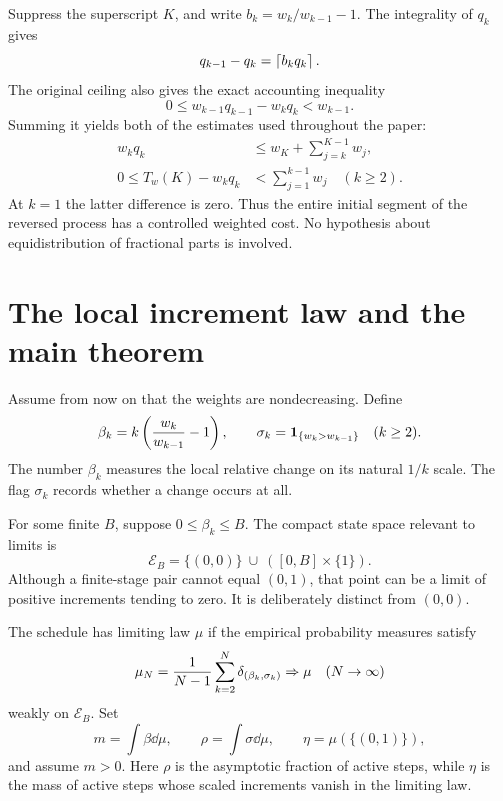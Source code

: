 Suppress the superscript $K$, and write $b_k=w_k/w_{k-1}-1$. The
integrality of $q_k$ gives
\begin{equation}\label{rex:sch:eq:integer-increment}
 q_{k-1}-q_k=\left\lceil b_kq_k\right\rceil.
\end{equation}
The original ceiling also gives the exact accounting inequality
\begin{equation}\label{rex:sch:eq:accounting}
 0\leq w_{k-1}q_{k-1}-w_kq_k<w_{k-1}.
\end{equation}
Summing it yields both of the estimates used throughout the paper:
\begin{align}
 w_kq_k&\leq w_K+\sum_{j=k}^{K-1}w_j,
 \label{rex:sch:eq:global-accounting}\\
 0\leq T_w(K)-w_kq_k&<\sum_{j=1}^{k-1}w_j\quad(k\geq2).
 \label{rex:sch:eq:tail-accounting}
\end{align}
At $k=1$ the latter difference is zero. Thus the entire initial segment
of the reversed process has a controlled weighted cost. No hypothesis
about equidistribution of fractional parts is involved.

\section{The local increment law and the main theorem}
\label{rex:sch:sec:main}

Assume from now on that the weights are nondecreasing. Define
\begin{equation}\label{rex:sch:eq:environment}
 \beta_k=k\left(\frac{w_k}{w_{k-1}}-1\right),\qquad
 \sigma_k=\mathbf 1_{\{w_k>w_{k-1}\}}\quad(k\geq2).
\end{equation}
The number $\beta_k$ measures the local relative change on its natural
$1/k$ scale. The flag $\sigma_k$ records whether a change occurs at all.

For some finite $B$, suppose $0\leq\beta_k\leq B$. The compact state
space relevant to limits is
\begin{equation}\label{rex:sch:eq:state-space}
 \mathcal E_B=\{(0,0)\}\ \cup\ ([0,B]\times\{1\}).
\end{equation}
Although a finite-stage pair cannot equal $(0,1)$, that point can be a
limit of positive increments tending to zero. It is deliberately
distinct from $(0,0)$.

\begin{definition}\label{rex:sch:def:law}
The schedule has limiting law $\mu$ if the empirical probability
measures satisfy
\begin{equation}\label{rex:sch:eq:empirical}
 \mu_N=\frac{1}{N-1}\sum_{k=2}^{N}\delta_{(\beta_k,\sigma_k)}
 \mathrel{\Rightarrow}\mu
 \quad(N\to\infty)
\end{equation}
weakly on $\mathcal E_B$. Set
\begin{equation}\label{rex:sch:eq:m-rho-eta}
 m=\int\beta\dd\mu,\qquad
 \rho=\int\sigma\dd\mu,\qquad
 \eta=\mu(\{(0,1)\}),
\end{equation}
and assume $m>0$. Here $\rho$ is the asymptotic fraction of active
steps, while $\eta$ is the mass of active steps whose scaled increments
vanish in the limiting law.
\end{definition}

